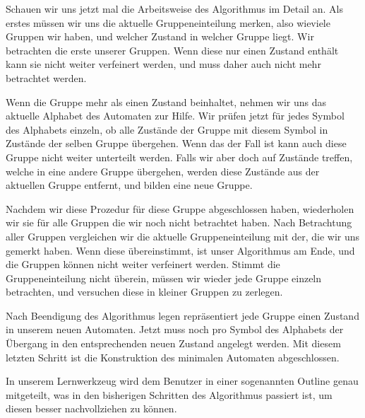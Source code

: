 Schauen wir uns jetzt mal die Arbeitsweise des Algorithmus im Detail an. Als
erstes müssen wir uns die aktuelle Gruppeneinteilung merken, also wieviele
Gruppen wir haben, und welcher Zustand in welcher Gruppe liegt. Wir betrachten
die erste unserer Gruppen. Wenn diese nur einen Zustand enthält kann sie nicht
weiter verfeinert werden, und muss daher auch nicht mehr betrachtet werden. 

Wenn die Gruppe mehr als einen Zustand beinhaltet, nehmen wir uns das aktuelle
Alphabet des Automaten zur Hilfe. Wir prüfen jetzt für jedes Symbol des Alphabets
einzeln, ob alle Zustände der Gruppe mit diesem Symbol in Zustände der selben
Gruppe übergehen. Wenn das der Fall ist kann auch diese Gruppe nicht weiter
unterteilt werden. Falls wir aber doch auf Zustände treffen, welche in eine
andere Gruppe übergehen, werden diese Zustände aus der aktuellen Gruppe entfernt,
und bilden eine neue Gruppe. 

Nachdem wir diese Prozedur für diese Gruppe
abgeschlossen haben, wiederholen wir sie für alle Gruppen die wir noch nicht
betrachtet haben. Nach Betrachtung aller Gruppen vergleichen wir die aktuelle
Gruppeneinteilung mit der, die wir uns gemerkt haben. Wenn diese übereinstimmt,
ist unser Algorithmus am Ende, und die Gruppen können nicht weiter verfeinert
werden. Stimmt die Gruppeneinteilung nicht überein, müssen wir wieder jede
Gruppe einzeln betrachten, und versuchen diese in kleiner Gruppen zu
zerlegen.\vspace{10pt}

Nach Beendigung des Algorithmus legen repräsentiert jede Gruppe einen Zustand
in unserem neuen Automaten. Jetzt muss noch pro Symbol des Alphabets der
Übergang in den entsprechenden neuen Zustand angelegt werden. Mit diesem
letzten Schritt ist die Konstruktion des minimalen Automaten
abgeschlossen.\vspace{10pt}

In unserem Lernwerkzeug wird dem Benutzer in einer sogenannten Outline genau
mitgeteilt, was in den bisherigen Schritten des Algorithmus passiert ist, um
diesen besser nachvollziehen zu können.\vspace{10pt}



